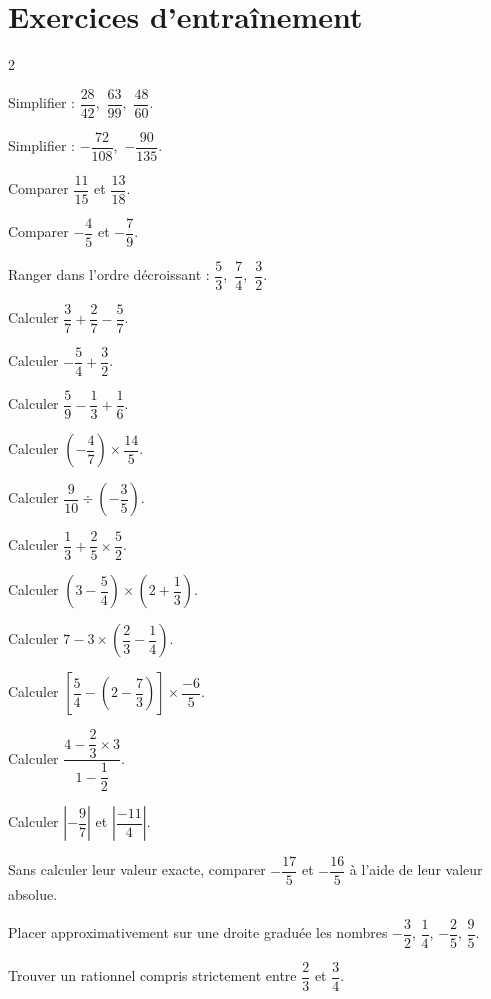 \section{Exercices d'entraînement}
\begin{multicols}{2}

\exo{} Simplifier : $\dfrac{28}{42}$,\ $\dfrac{63}{99}$,\ $\dfrac{48}{60}$.

\exo{} Simplifier : $-\dfrac{72}{108}$,\ $-\dfrac{90}{135}$.

\exo{} Comparer $\dfrac{11}{15}$ et $\dfrac{13}{18}$.

\exo{} Comparer $-\dfrac45$ et $-\dfrac79$.

\exo{} Ranger dans l'ordre décroissant : $\dfrac53$,\ $\dfrac74$,\ $\dfrac32$.

\exo{} Calculer $\dfrac37+\dfrac27-\dfrac57$.

\exo{} Calculer $-\dfrac54+\dfrac32$.

\exo{} Calculer $\dfrac59-\dfrac13+\dfrac16$.

\exo{} Calculer $\left(-\dfrac47\right)\times\dfrac{14}5$.

\exo{} Calculer $\dfrac{9}{10}\div\left(-\dfrac35\right)$.

\exo{} Calculer $\dfrac13+\dfrac25\times\dfrac52$.

\exo{} Calculer $\left(3-\dfrac54\right)\times\left(2+\dfrac13\right)$.

\exo{} Calculer $7-3\times\left(\dfrac23-\dfrac14\right)$.

\exo{} Calculer $\left[\dfrac54-\left(2-\dfrac73\right)\right]\times\dfrac{-6}5$.

\exo{} Calculer $\dfrac{4-\dfrac23\times3}{1-\dfrac12}$.

\exo{} Calculer $\left|-\dfrac97\right|$ et $\left|\dfrac{-11}4\right|$.

\exo{} Sans calculer leur valeur exacte, comparer $-\dfrac{17}5$ et $-\dfrac{16}5$ à
l'aide de leur valeur absolue.

\exo{} Placer approximativement sur une droite graduée les nombres $-\dfrac32$,
$\dfrac14$, $-\dfrac25$, $\dfrac95$.

\exo{} Trouver un rationnel compris strictement entre $\dfrac23$ et $\dfrac34$.


\end{multicols}
